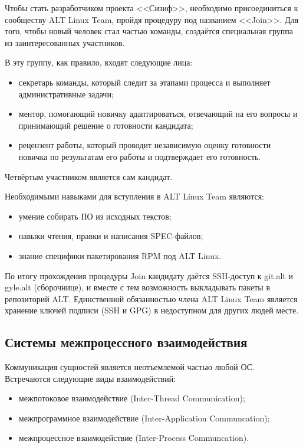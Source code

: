 \documentclass[bachelor, och, pract]{SCWorks}
\begin{document}
Чтобы стать разработчиком проекта <<Сизиф>>, необходимо присоединиться к сообществу ALT Linux Team, пройдя процедуру под названием <<Join>>. 
Для того, чтобы новый человек стал частью команды, создаётся специальная группа из заинтересованных участников.

В эту группу, как правило, входят следующие лица:
\begin{itemize}
    \item секретарь команды, который следит за этапами процесса и выполняет административные задачи;
    \item ментор, помогающий новичку адаптироваться, отвечающий на его вопросы и принимающий решение о готовности кандидата;
    \item рецензент работы, который проводит независимую оценку готовности новичка по результатам его работы и подтверждает его готовность.
\end{itemize}
Четвёртым участником является сам кандидат.

Необходимыми навыками для вступления в ALT Linux Team являются:
\begin{itemize}
    \item умение собирать ПО из исходных текстов;
    \item навыки чтения, правки и написания SPEC-файлов;
    \item знание специфики пакетирования RPM под ALT Linux.
\end{itemize}

По итогу прохождения процедуры Join кандидату даётся SSH-доступ к git.alt и gyle.alt (сборочнице), и вместе с тем возможность выкладывать пакеты в репозиторий ALT.
Единственной обязанностью члена ALT Linux Team является хранение ключей подписи (SSH и GPG) в недоступном для других людей месте\cite{a_join}.

\subsection{Системы межпроцессного взаимодействия}

Коммуникация сущностей является неотъемлемой частью любой ОС.
Встречаются следующие виды взаимодействий:

\begin{itemize}
    \item межпотоковое взаимодействие (Inter-Thread Communication);
    \item межпрограммное взаимодействие (Inter-Application Communcation);
    \item межпроцессное взаимодействие (Inter-Process Communcation).
\end{itemize}
\end{document}
